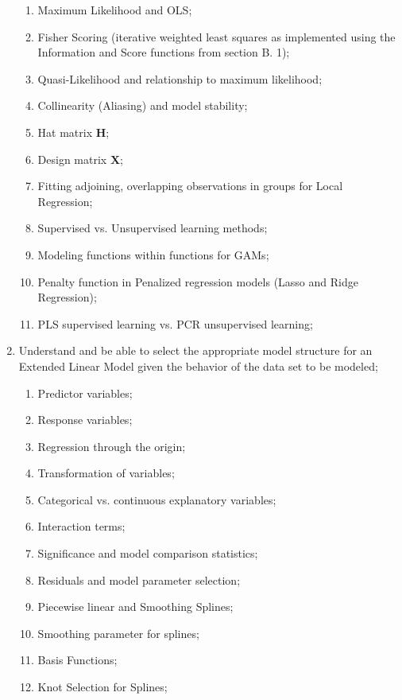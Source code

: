 \documentclass[12pt, titlepage, french]{report}
\begin{document}
\begin{outcomes}
\begin{enumerate}
\begin{knowledge}
	\begin{enumerate}[label = \alph*.]
		\item	Maximum Likelihood and OLS;
		\item	Fisher Scoring (iterative weighted least squares as implemented using the Information and Score functions from section B. 1);
		\item	Quasi-Likelihood and relationship to maximum likelihood;
		\item	Collinearity (Aliasing) and model stability; 
		\item	Hat matrix $\bm{H}$;
		\item	Design matrix $\bm{X}$;
		\item	Fitting adjoining, overlapping observations in groups for Local Regression;
		\item	Supervised vs. Unsupervised learning methods;
		\item	Modeling functions within functions for GAMs;
		\item	Penalty function in Penalized regression models (Lasso and Ridge Regression);
		\item	PLS supervised learning vs. PCR unsupervised learning;
	\end{enumerate}
	\end{knowledge}
\tcbline
	\item	Understand and be able to select the appropriate model structure for an Extended Linear Model given the behavior of the data set to be modeled;
	\begin{knowledge}
	\begin{enumerate}[label = \alph*.]
		\item	Predictor variables;
		\item	Response variables;
		\item	Regression through the origin;
		\item	Transformation of variables;
		\item	Categorical vs. continuous explanatory variables;
		\item	Interaction terms;
		\item	Significance and model comparison statistics;
		\item	Residuals and model parameter selection;
		\item	Piecewise linear and Smoothing Splines;
		\item	Smoothing parameter for splines;
		\item	Basis Functions;
		\item	Knot Selection for Splines;

\end{enumerate}
\end{knowledge}
\end{enumerate}
\end{outcomes}
\end{document}
